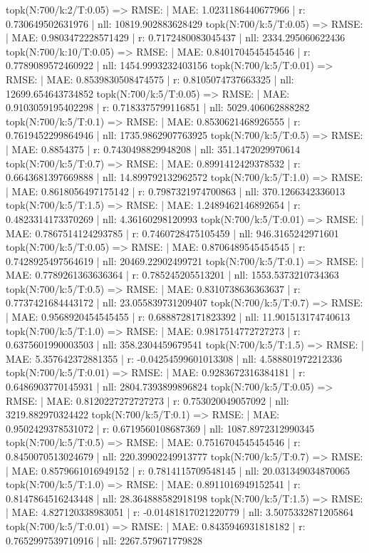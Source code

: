 topk(N:700/k:2/T:0.05) => RMSE: | MAE: 1.0231186440677966 | r: 0.730649502631976 | nll: 10819.902883628429
topk(N:700/k:5/T:0.05) => RMSE: | MAE: 0.9803472228571429 | r: 0.7172480083045437 | nll: 2334.295060622436
topk(N:700/k:10/T:0.05) => RMSE: | MAE: 0.8401704545454546 | r: 0.7789089572460922 | nll: 1454.9993232403156
topk(N:700/k:5/T:0.01) => RMSE: | MAE: 0.8539830508474575 | r: 0.8105074737663325 | nll: 12699.654643734852
topk(N:700/k:5/T:0.05) => RMSE: | MAE: 0.9103059195402298 | r: 0.7183375799116851 | nll: 5029.406062888282
topk(N:700/k:5/T:0.1) => RMSE: | MAE: 0.8530621468926555 | r: 0.7619452299864946 | nll: 1735.9862907763925
topk(N:700/k:5/T:0.5) => RMSE: | MAE: 0.8854375 | r: 0.7430498829948208 | nll: 351.1472029970614
topk(N:700/k:5/T:0.7) => RMSE: | MAE: 0.8991412429378532 | r: 0.6643681397669888 | nll: 14.899792132962572
topk(N:700/k:5/T:1.0) => RMSE: | MAE: 0.8618056497175142 | r: 0.7987321974700863 | nll: 370.1266342336013
topk(N:700/k:5/T:1.5) => RMSE: | MAE: 1.2489462146892654 | r: 0.4823314173370269 | nll: 4.36160298120993
topk(N:700/k:5/T:0.01) => RMSE: | MAE: 0.7867514124293785 | r: 0.7460728475105459 | nll: 946.3165242971601
topk(N:700/k:5/T:0.05) => RMSE: | MAE: 0.8706489545454545 | r: 0.7428925497564619 | nll: 20469.22902499721
topk(N:700/k:5/T:0.1) => RMSE: | MAE: 0.7789261363636364 | r: 0.785245205513201 | nll: 1553.5373210734363
topk(N:700/k:5/T:0.5) => RMSE: | MAE: 0.8310738636363637 | r: 0.7737421684443172 | nll: 23.055839731209407
topk(N:700/k:5/T:0.7) => RMSE: | MAE: 0.9568920454545455 | r: 0.6888728171823392 | nll: 11.901513174740613
topk(N:700/k:5/T:1.0) => RMSE: | MAE: 0.9817514772727273 | r: 0.6375601990003503 | nll: 358.2304459679541
topk(N:700/k:5/T:1.5) => RMSE: | MAE: 5.357642372881355 | r: -0.04254599601013308 | nll: 4.588801972212336
topk(N:700/k:5/T:0.01) => RMSE: | MAE: 0.9283672316384181 | r: 0.6486903770145931 | nll: 2804.7393899896824
topk(N:700/k:5/T:0.05) => RMSE: | MAE: 0.8120227272727273 | r: 0.753020049057092 | nll: 3219.882970324422
topk(N:700/k:5/T:0.1) => RMSE: | MAE: 0.9502429378531072 | r: 0.6719560108687369 | nll: 1087.8972312990345
topk(N:700/k:5/T:0.5) => RMSE: | MAE: 0.7516704545454546 | r: 0.8450070513024679 | nll: 220.39902249913777
topk(N:700/k:5/T:0.7) => RMSE: | MAE: 0.8579661016949152 | r: 0.7814115709548145 | nll: 20.031349034870065
topk(N:700/k:5/T:1.0) => RMSE: | MAE: 0.8911016949152541 | r: 0.8147864516243448 | nll: 28.364888582918198
topk(N:700/k:5/T:1.5) => RMSE: | MAE: 4.827120338983051 | r: -0.01481817021220779 | nll: 3.5075332871205864
topk(N:700/k:5/T:0.01) => RMSE: | MAE: 0.8435946931818182 | r: 0.7652997539710916 | nll: 2267.579671779828

